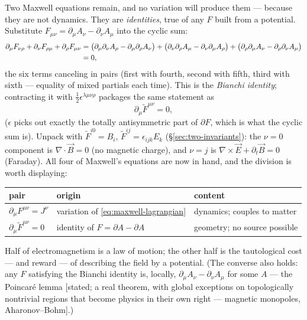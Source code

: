 \documentclass[11pt]{article}
\theoremstyle{plain}
\theoremstyle{definition}
\theoremstyle{remark}
\newcommand{\vE}{\vec{E}}
\newcommand{\vB}{\vec{B}}
\begin{document}
Two Maxwell equations remain, and no variation will produce them ---
because they are not dynamics. They are \emph{identities}, true of
any $F$ built from a potential. Substitute
$F_{\mu\nu} = \partial_\mu A_\nu - \partial_\nu A_\mu$ into the
cyclic sum:
\begin{align}
  \partial_\mu F_{\nu\rho}
  + \partial_\nu F_{\rho\mu}
  + \partial_\rho F_{\mu\nu}
  &= \bigl(\partial_\mu\partial_\nu A_\rho
         - \partial_\mu\partial_\rho A_\nu\bigr)
   + \bigl(\partial_\nu\partial_\rho A_\mu
         - \partial_\nu\partial_\mu A_\rho\bigr)
   + \bigl(\partial_\rho\partial_\mu A_\nu
         - \partial_\rho\partial_\nu A_\mu\bigr)
  \notag\\
  &= 0,
\end{align}
the six terms canceling in pairs (first with fourth, second with
fifth, third with sixth --- equality of mixed partials each time).
This is the \emph{Bianchi identity}; contracting it with
$\tfrac12\epsilon^{\lambda\mu\nu\rho}$ packages the same statement as
\begin{equation}
  \boxed{\;
  \partial_\mu \tilde F^{\mu\nu} = 0 ,
  \;}
  \label{eq:maxwell-homogeneous}
\end{equation}
($\epsilon$ picks out exactly the totally antisymmetric part of
$\partial F$, which is what the cyclic sum is). Unpack with
$\tilde F^{i0} = B_i$, $\tilde F^{ij} = \epsilon_{ijk}E_k$
(\S\ref{sec:two-invariants}): the $\nu = 0$ component is
$\nabla\cdot\vB = 0$ (no magnetic charge), and $\nu = j$ is
$\nabla\times\vE + \partial_t\vB = 0$ (Faraday). All four of
Maxwell's equations are now in hand, and the division is worth
displaying:
\begin{center}
\begin{tabular}{lll}
\toprule
pair & origin & content \\
\midrule
$\partial_\mu F^{\mu\nu} = J^\nu$ & variation of
\eqref{eq:maxwell-lagrangian} & dynamics; couples to matter \\
$\partial_\mu \tilde F^{\mu\nu} = 0$ & identity of $F = \partial A -
\partial A$ & geometry; no source possible \\
\bottomrule
\end{tabular}
\end{center}
Half of electromagnetism is a law of motion; the other half is the
tautological cost --- and reward --- of describing the field by a
potential. (The converse also holds: any $F$ satisfying the Bianchi
identity is, locally, $\partial_\mu A_\nu - \partial_\nu A_\mu$ for
some $A$ --- the Poincar\'e lemma [stated; a real theorem, with
global exceptions on topologically nontrivial regions that become
physics in their own right --- magnetic monopoles,
Aharonov--Bohm].)
\end{document}

